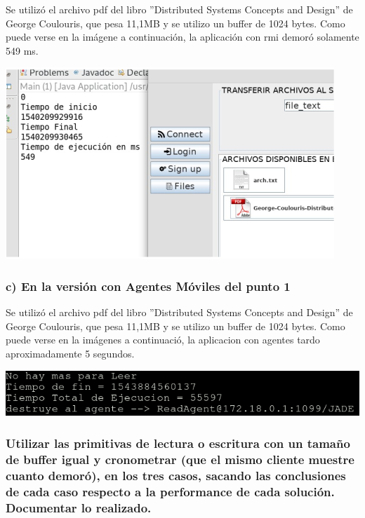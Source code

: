 \documentclass[11pt]{extarticle}
\begin{document}
    Se utilizó el archivo pdf del libro ''Distributed Systems Concepts and
Design'' de George Coulouris, que pesa 11,1MB y se utilizo un buffer de
1024 bytes. Como puede verse en la imágene a continuación, la aplicación
con rmi demoró solamente 549 ms.

\includegraphics{images/cronometro-2.png}

    \hypertarget{c-en-la-versiuxf3n-con-agentes-muxf3viles-del-punto-1}{%
\subsubsection{c) En la versión con Agentes Móviles del punto
1}\label{c-en-la-versiuxf3n-con-agentes-muxf3viles-del-punto-1}}

    Se utilizó el archivo pdf del libro ''Distributed Systems Concepts and
Design'' de George Coulouris, que pesa 11,1MB y se utilizo un buffer de
1024 bytes. Como puede verse en la imágenes a continuació, la aplicacion
con agentes tardo aproximadamente 5 segundos.

\includegraphics{images/cronometro-3.png}

    \hypertarget{utilizar-las-primitivas-de-lectura-o-escritura-con-un-tamauxf1o-de-buffer-igual-y-cronometrar-que-el-mismo-cliente-muestre-cuanto-demoruxf3-en-los-tres-casos-sacando-las-conclusiones-de-cada-caso-respecto-a-la-performance-de-cada-soluciuxf3n.-documentar-lo-realizado.}{%
\subsubsection{Utilizar las primitivas de lectura o escritura con un
tamaño de buffer igual y cronometrar (que el mismo cliente muestre
cuanto demoró), en los tres casos, sacando las conclusiones de cada caso
respecto a la performance de cada solución. Documentar lo
realizado.}\label{utilizar-las-primitivas-de-lectura-o-escritura-con-un-tamauxf1o-de-buffer-igual-y-cronometrar-que-el-mismo-cliente-muestre-cuanto-demoruxf3-en-los-tres-casos-sacando-las-conclusiones-de-cada-caso-respecto-a-la-performance-de-cada-soluciuxf3n.-documentar-lo-realizado.}}
\end{document}
